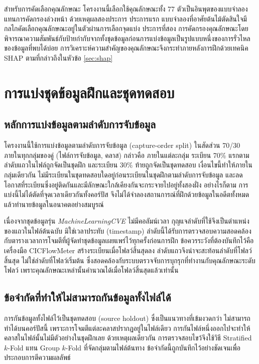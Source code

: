 สำหรับการคัดเลือกคุณลักษณะ โครงงานนี้เลือกใช้คุณลักษณะทั้ง 77 ตัวเป็นอินพุตของแบบจำลอง แทนการคัดกรองล่วงหน้า ด้วยเหตุผลสองประการ ประการแรก แบบจำลองที่อาศัยต้นไม้ตัดสินใจมีกลไกคัดเลือกคุณลักษณะอยู่ในตัวผ่านการเลือกจุดแบ่ง ประการที่สอง การคัดกรองคุณลักษณะโดยพิจารณาความสัมพันธ์กับป้ายกำกับจากทั้งชุดข้อมูลก่อนการแบ่งข้อมูลเป็นรูปแบบหนึ่งของการรั่วไหลของข้อมูลที่พบได้บ่อย \cite{arp2022dosdonts} การวิเคราะห์ความสำคัญของคุณลักษณะจึงกระทำภายหลังการฝึกด้วยเทคนิค SHAP ตามที่กล่าวถึงในหัวข้อ \ref{sec:shap}

\section{การแบ่งชุดข้อมูลฝึกและชุดทดสอบ}
\label{sec:split}

\subsection{หลักการแบ่งข้อมูลตามลำดับการจับข้อมูล}

โครงงานนี้ใช้การแบ่งข้อมูลตามลำดับการจับข้อมูล (capture-order split) ในสัดส่วน 70/30 ภายในทุกกลุ่มของคู่ (ไฟล์การจับข้อมูล, คลาส) กล่าวคือ ภายในแต่ละกลุ่ม ระเบียน 70\% แรกตามลำดับแถวในไฟล์ถูกจัดเป็นชุดฝึก และระเบียน 30\% ท้ายถูกจัดเป็นชุดทดสอบ เงื่อนไขนี้ทำให้ภายในกลุ่มเดียวกัน ไม่มีระเบียนในชุดทดสอบใดอยู่ก่อนระเบียนในชุดฝึกตามลำดับการจับข้อมูล และลดโอกาสที่ระเบียนซึ่งอยู่ติดกันและมีลักษณะใกล้เคียงกันจะกระจายไปอยู่ทั้งสองฝั่ง อย่างไรก็ตาม การแบ่งนี้ไม่ได้ตัดที่จุดเวลาเดียวกันทั้งคอร์ปัส จึงไม่ได้จำลองสถานการณ์ที่ฝึกด้วยข้อมูลในอดีตทั้งหมดแล้วทำนายข้อมูลในอนาคตอย่างสมบูรณ์

เนื่องจากชุดข้อมูลรุ่น \textit{MachineLearningCVE} ไม่มีคอลัมน์เวลา กุญแจลำดับที่ใช้จึงเป็นตำแหน่งของแถวในไฟล์ต้นฉบับ มิใช่เวลาประทับ (timestamp) ลำดับนี้ได้รับการตรวจสอบความสอดคล้องกับตารางเวลาการโจมตีที่ผู้จัดทำชุดข้อมูลเผยแพร่ไว้ทุกครั้งก่อนการฝึก ข้อควรระวังที่ต้องบันทึกไว้คือ เครื่องมือ CICFlowMeter สร้างระเบียนเมื่อโฟลว์สิ้นสุดลง ลำดับแถวจึงน่าจะสะท้อนลำดับที่โฟลว์สิ้นสุด ไม่ใช่ลำดับที่โฟลว์เริ่มต้น ซึ่งสอดคล้องกับระบบตรวจจับการบุกรุกที่ทำงานกับคุณลักษณะระดับโฟลว์ เพราะคุณลักษณะเหล่านั้นคำนวณได้เมื่อโฟลว์สิ้นสุดแล้วเท่านั้น

\subsection{ข้อจำกัดที่ทำให้ไม่สามารถกันข้อมูลทั้งไฟล์ได้}

การกันข้อมูลทั้งไฟล์ไว้เป็นชุดทดสอบ (source holdout) ซึ่งเป็นแนวทางที่เข้มงวดกว่า ไม่สามารถทำได้บนคอร์ปัสนี้ เพราะการโจมตีแต่ละคลาสปรากฏอยู่ในไฟล์เดียว การกันไฟล์หนึ่งออกไปจะทำให้คลาสในไฟล์นั้นไม่มีตัวอย่างในชุดฝึกเลย ด้วยเหตุผลเดียวกัน การตรวจสอบไขว้จึงใช้วิธี Stratified $k$-Fold แทน Group $k$-Fold ที่จัดกลุ่มตามไฟล์ต้นทาง ข้อจำกัดนี้ถูกบันทึกไว้อย่างชัดเจนเพื่อประกอบการตีความผลลัพธ์

